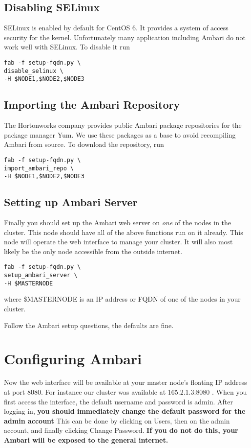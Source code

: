 \documentclass[9pt,twocolumn,twoside]{idsi}
\begin{document}
\subsection{Disabling SELinux}
SELinux is enabled by default for CentOS 6. It provides a system of access security for the kernel. Unfortunately many application including Ambari do not work well with SELinux. To disable it run

\begin{verbatim}
fab -f setup-fqdn.py \
disable_selinux \
-H $NODE1,$NODE2,$NODE3
\end{verbatim}

\subsection{Importing the Ambari Repository}
The Hortonworks company provides public Ambari package repositories for the package manager Yum. We use these packages as a base to avoid recompiling Ambari from source. To download the repository, run

\begin{verbatim}
fab -f setup-fqdn.py \
import_ambari_repo \
-H $NODE1,$NODE2,$NODE3
\end{verbatim}

\subsection{Setting up Ambari Server}

Finally you should set up the Ambari web server on \emph{one} of the nodes in the cluster. This node should have all of the above functions run on it already. This node will operate the web interface to manage your cluster. It will also most likely be the only node accessible from the outside internet.

\begin{verbatim}
fab -f setup-fqdn.py \
setup_ambari_server \
-H $MASTERNODE
\end{verbatim}

where \$MASTERNODE is an IP address or FQDN of one of the nodes in your cluster.

Follow the Ambari setup questions, the defaults are fine.

\section{Configuring Ambari}
Now the web interface will be available at your master node's floating IP address at port 8080. For instance our cluster was available at 165.2.1.3:8080 . When you first access the interface, the default username and password is admin. After logging in, \textbf{you should immediately change the default password for the admin account} This can be done by clicking on Users, then on the admin account, and finally clicking Change Password. \textbf{If you do not do this, your Ambari will be exposed to the general internet.}
\end{document}
